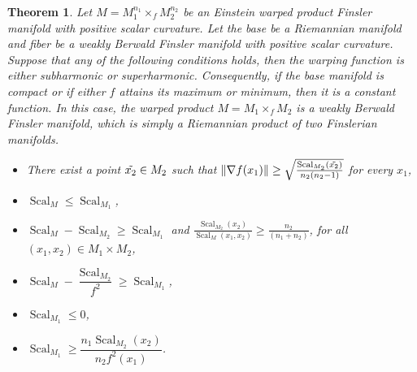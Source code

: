 \documentclass[pdflatex,sn-mathphys-num]{sn-jnl}%
\theoremstyle{thmstyleone}%
\newtheorem{theorem}{Theorem}%
\theoremstyle{thmstyletwo}%
\theoremstyle{thmstylethree}%
\begin{document}
\begin{theorem}\label{thm4.2}
	Let $M=M_1^{n_1}\times_{f} M_2^{n_2}$ be an Einstein warped product Finsler manifold with 
 positive scalar curvature. 
 Let the base be a Riemannian manifold and fiber be  a weakly Berwald Finsler manifold with 
positive scalar curvature.
Suppose that 
  any of  the following conditions holds, then the 
  warping function is either subharmonic or superharmonic. Consequently, if the base manifold is compact 
  or if either $f$ attains its maximum or minimum, then
  it is a constant function. In this case,
   the warped product $M=M_1\times_f M_2$ is a weakly Berwald Finsler manifold, which is  simply a Riemannian product of two Finslerian manifolds.
	\begin{itemize}
		\item[\emph{(a)}] There exist a point $\Tilde{x_2}\in M_2$ such that 
  $\|\nabla f(x_1)\|\geq \sqrt{\frac{\operatorname{Scal}_{M_2}(\Tilde{x_2})}{n_2(n_2-1)}}$ for every $x_1$,
		
		\item[\emph{(b)}] $\operatorname{Scal}_M\leq \operatorname{Scal}_{M_1}$,
		
		\item[\emph{(c)}] $\operatorname{Scal}_M-\operatorname{Scal}_{M_2}\geq \operatorname{Scal}_{M_1}$ and $\frac{\operatorname{Scal}_{M_2}(x_2)}{\operatorname{Scal}_{M}(x_1,x_2)}\geq\frac{n_2}{(n_1+n_2)}$, for all $(x_1,x_2)\in M_1\times M_2$,
		
		\item[\emph{(d)}] $\operatorname{Scal}_M-\dfrac{\operatorname{Scal}_{M_2}}{f^2}\geq \operatorname{Scal}_{M_1}$, 
		
		\item[\emph{(e)}] $\operatorname{Scal}_{M_1}\leq 0$,
		
		\item[\emph{(f)}] $\operatorname{Scal}_{M_1}\geq\dfrac{n_1\operatorname{Scal}_{M_2}(x_2)}{n_2f^2(x_1)}$. 
	\end{itemize} 
\end{theorem}	
\end{document}
